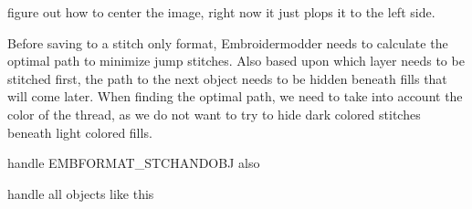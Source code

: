 \begin{DoxyRefList}
\label{todo__todo000018}%
%
figure out how to center the image, right now it just plops it to the left side.  
\item[Member \mbox{\hyperlink{imgui__main_8c_ab7315b158db533fb73b44c2cbfe3c394}{save\+\_\+save}} (const char $\ast$file\+Name)]\label{todo__todo000209}%
%
Before saving to a stitch only format, Embroidermodder needs to calculate the optimal path to minimize jump stitches. Also based upon which layer needs to be stitched first, the path to the next object needs to be hidden beneath fills that will come later. When finding the optimal path, we need to take into account the color of the thread, as we do not want to try to hide dark colored stitches beneath light colored fills.

\label{todo__todo000210}%
%
handle EMBFORMAT\+\_\+\+STCHANDOBJ also 

\label{todo__todo000211}%
%
handle all objects like this 


\end{DoxyRefList}
